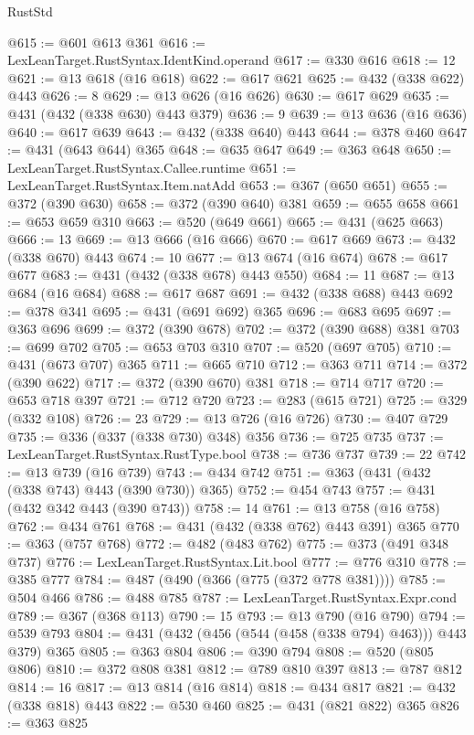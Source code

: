 \begin{lexlean}{RustStd}
\begin{coremodule}
@615 := @601 @613 @361
@616 := LexLeanTarget.RustSyntax.IdentKind.operand
@617 := @330 @616
@618 := 12
@621 := @13 @618 (@16 @618)
@622 := @617 @621
@625 := @432 (@338 @622) @443
@626 := 8
@629 := @13 @626 (@16 @626)
@630 := @617 @629
@635 := @431 (@432 (@338 @630) @443 @379)
@636 := 9
@639 := @13 @636 (@16 @636)
@640 := @617 @639
@643 := @432 (@338 @640) @443
@644 := @378 @460
@647 := @431 (@643 @644) @365
@648 := @635 @647
@649 := @363 @648
@650 := LexLeanTarget.RustSyntax.Callee.runtime
@651 := LexLeanTarget.RustSyntax.Item.natAdd
@653 := @367 (@650 @651)
@655 := @372 (@390 @630)
@658 := @372 (@390 @640) @381
@659 := @655 @658
@661 := @653 @659 @310
@663 := @520 (@649 @661)
@665 := @431 (@625 @663)
@666 := 13
@669 := @13 @666 (@16 @666)
@670 := @617 @669
@673 := @432 (@338 @670) @443
@674 := 10
@677 := @13 @674 (@16 @674)
@678 := @617 @677
@683 := @431 (@432 (@338 @678) @443 @550)
@684 := 11
@687 := @13 @684 (@16 @684)
@688 := @617 @687
@691 := @432 (@338 @688) @443
@692 := @378 @341
@695 := @431 (@691 @692) @365
@696 := @683 @695
@697 := @363 @696
@699 := @372 (@390 @678)
@702 := @372 (@390 @688) @381
@703 := @699 @702
@705 := @653 @703 @310
@707 := @520 (@697 @705)
@710 := @431 (@673 @707) @365
@711 := @665 @710
@712 := @363 @711
@714 := @372 (@390 @622)
@717 := @372 (@390 @670) @381
@718 := @714 @717
@720 := @653 @718 @397
@721 := @712 @720
@723 := @283 (@615 @721)
@725 := @329 (@332 @108)
@726 := 23
@729 := @13 @726 (@16 @726)
@730 := @407 @729
@735 := @336 (@337 (@338 @730) @348) @356
@736 := @725 @735
@737 := LexLeanTarget.RustSyntax.RustType.bool
@738 := @736 @737
@739 := 22
@742 := @13 @739 (@16 @739)
@743 := @434 @742
@751 := @363 (@431 (@432 (@338 @743) @443 (@390 @730)) @365)
@752 := @454 @743
@757 := @431 (@432 @342 @443 (@390 @743))
@758 := 14
@761 := @13 @758 (@16 @758)
@762 := @434 @761
@768 := @431 (@432 (@338 @762) @443 @391) @365
@770 := @363 (@757 @768)
@772 := @482 (@483 @762)
@775 := @373 (@491 @348 @737)
@776 := LexLeanTarget.RustSyntax.Lit.bool
@777 := @776 @310
@778 := @385 @777
@784 := @487 (@490 (@366 (@775 (@372 @778 @381))))
@785 := @504 @466
@786 := @488 @785
@787 := LexLeanTarget.RustSyntax.Expr.cond
@789 := @367 (@368 @113)
@790 := 15
@793 := @13 @790 (@16 @790)
@794 := @539 @793
@804 := @431 (@432 (@456 (@544 (@458 (@338 @794) @463))) @443 @379) @365
@805 := @363 @804
@806 := @390 @794
@808 := @520 (@805 @806)
@810 := @372 @808 @381
@812 := @789 @810 @397
@813 := @787 @812
@814 := 16
@817 := @13 @814 (@16 @814)
@818 := @434 @817
@821 := @432 (@338 @818) @443
@822 := @530 @460
@825 := @431 (@821 @822) @365
@826 := @363 @825

\end{coremodule}
\end{lexlean}
